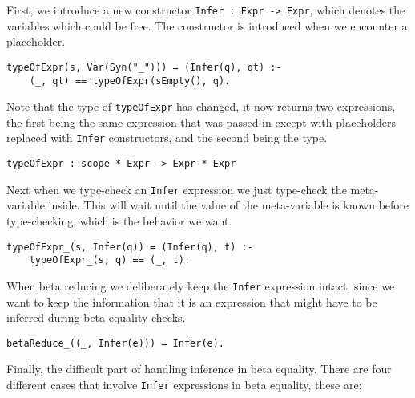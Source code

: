 First, we introduce a new constructor \verb|Infer : Expr -> Expr|, which denotes the variables which could be free. The constructor is introduced when we encounter a placeholder.
\begin{lstlisting}
typeOfExpr(s, Var(Syn("_"))) = (Infer(q), qt) :-
	(_, qt) == typeOfExpr(sEmpty(), q).
\end{lstlisting}

Note that the type of \verb|typeOfExpr| has changed, it now returns two expressions, the first being the same expression that was passed in except with placeholders replaced with \verb|Infer| constructors, and the second being the type.
\begin{lstlisting}
typeOfExpr : scope * Expr -> Expr * Expr
\end{lstlisting}

Next when we type-check an \verb|Infer| expression we just type-check the meta-variable inside. This will wait until the value of the meta-variable is known before type-checking, which is the behavior we want.
\begin{lstlisting}
typeOfExpr_(s, Infer(q)) = (Infer(q), t) :-
	typeOfExpr_(s, q) == (_, t).
\end{lstlisting}

When beta reducing we deliberately keep the \verb|Infer| expression intact, since we want to keep the information that it is an expression that might have to be inferred during beta equality checks.
\begin{lstlisting}
betaReduce_((_, Infer(e))) = Infer(e).
\end{lstlisting}

Finally, the difficult part of handling inference in beta equality. There are four different cases that involve \verb|Infer| expressions in beta equality, these are:


